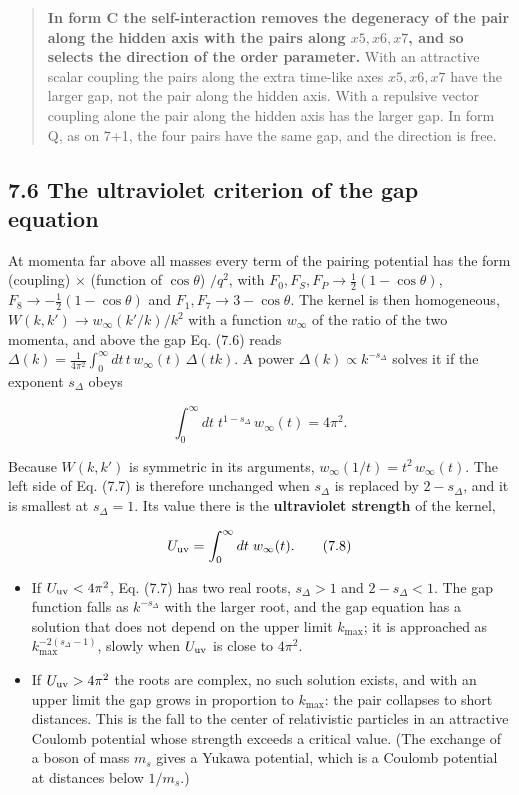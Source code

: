 \documentclass[
  10pt,
]{article}
\providecommand{\tightlist}{%
  \setlength{\itemsep}{0pt}\setlength{\parskip}{0pt}}
\begin{document}
\begin{quote}
\textbf{In form C the self-interaction removes the degeneracy of the
pair along the hidden axis with the pairs along \(x5,x6,x7\), and so
selects the direction of the order parameter.} With an attractive scalar
coupling the pairs along the extra time-like axes \(x5,x6,x7\) have the
larger gap, not the pair along the hidden axis. With a repulsive vector
coupling alone the pair along the hidden axis has the larger gap. In
form Q, as on 7+1, the four pairs have the same gap, and the direction
is free.
\end{quote}

\hypertarget{the-ultraviolet-criterion-of-the-gap-equation}{%
\subsection{7.6 The ultraviolet criterion of the gap
equation}\label{the-ultraviolet-criterion-of-the-gap-equation}}

At momenta far above all masses every term of the pairing potential has
the form (coupling) \(\times\) (function of \(\cos\theta\)) \(/q^2\),
with \(F_0,F_S,F_P\to\tfrac12(1-\cos\theta)\),
\(F_8\to-\tfrac12(1-\cos\theta)\) and \(F_1,F_7\to3-\cos\theta\). The
kernel is then homogeneous, \(W(k,k')\to w_\infty(k'/k)/k^2\) with a
function \(w_\infty\) of the ratio of the two momenta, and above the gap
Eq. (7.6) reads
\(\Delta(k)=\tfrac1{4\pi^2}\int_0^\infty dt\,t\,w_\infty(t)\,\Delta(tk)\).
A power \(\Delta(k)\propto k^{-s_\Delta}\) solves it if the exponent
\(s_\Delta\) obeys

\[\int_0^\infty dt\;t^{1-s_\Delta}\,w_\infty(t)=4\pi^2.\tag{7.7}\]

Because \(W(k,k')\) is symmetric in its arguments,
\(w_\infty(1/t)=t^2\,w_\infty(t)\). The left side of Eq. (7.7) is
therefore unchanged when \(s_\Delta\) is replaced by \(2-s_\Delta\), and
it is smallest at \(s_\Delta=1\). Its value there is the
\textbf{ultraviolet strength} of the kernel,

\[U_{\rm uv}=\int_0^\infty dt\;w_\infty(t).\tag{7.8}\]

\begin{itemize}
\tightlist
\item
  If \(U_{\rm uv}<4\pi^2\), Eq. (7.7) has two real roots, \(s_\Delta>1\)
  and \(2-s_\Delta<1\). The gap function falls as \(k^{-s_\Delta}\) with
  the larger root, and the gap equation has a solution that does not
  depend on the upper limit \(k_{\max}\); it is approached as
  \(k_{\max}^{-2(s_\Delta-1)}\), slowly when \(U_{\rm uv}\) is close to
  \(4\pi^2\).
\item
  If \(U_{\rm uv}>4\pi^2\) the roots are complex, no such solution
  exists, and with an upper limit the gap grows in proportion to
  \(k_{\max}\): the pair collapses to short distances. This is the fall
  to the center of relativistic particles in an attractive Coulomb
  potential whose strength exceeds a critical value. (The exchange of a
  boson of mass \(m_s\) gives a Yukawa potential, which is a Coulomb
  potential at distances below \(1/m_s\).)
\end{itemize}
\end{document}
